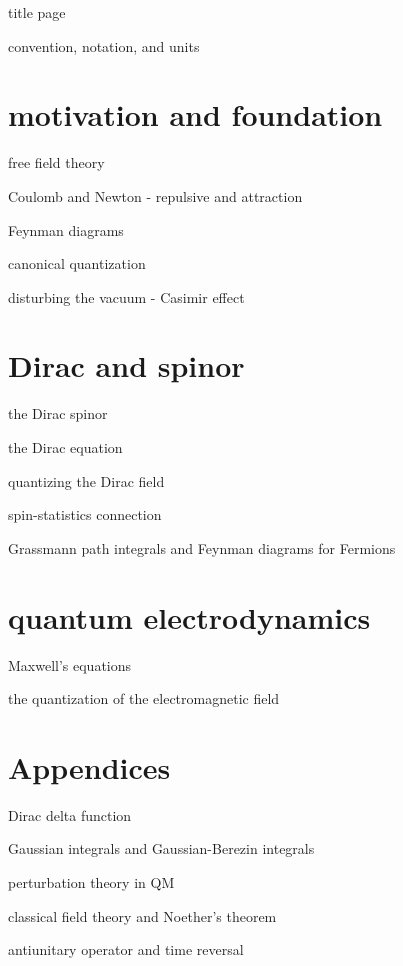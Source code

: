 \documentclass[10pt, a4paper]{report}
\renewcommand{\chaptermark}[1]{%
	\markboth{Chapter \thechapter\ #1}{}%
}
\numberwithin{equation}{section}
\begin{document}
	{title page}
	
	\tableofcontents
	
	\pagebreak
	
	{convention, notation, and units}
	
	\part{motivation and foundation}
	
	{free field theory}
	
	{Coulomb and Newton - repulsive and attraction}
	
	{Feynman diagrams}
	
	{canonical quantization}
	
	{disturbing the vacuum - Casimir effect}
	
	\part{Dirac and spinor} \label{part II}
	
	{the Dirac spinor}
	
	{the Dirac equation}
	
	{quantizing the Dirac field}
	
	{spin-statistics connection}
	
	{Grassmann path integrals and Feynman diagrams for Fermions}
	
	\part{quantum electrodynamics}
	
	{Maxwell's equations}
	
	{the quantization of the electromagnetic field}
	
	\appendix
	
	\part*{Appendices}
	\renewcommand{\chaptermark}[1]{%
		\markboth{Appendix \thechapter\ #1}{}%
	}
	
	{Dirac delta function}
	
	{Gaussian integrals and Gaussian-Berezin integrals}
	
	{perturbation theory in QM}
	
	{classical field theory and Noether's theorem}
	
	{antiunitary operator and time reversal}
\end{document}
